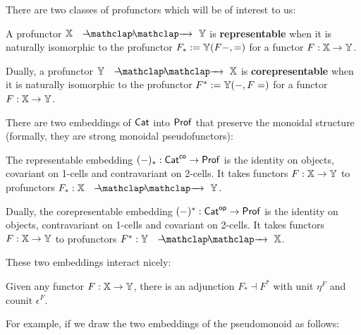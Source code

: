 There are two classes of profunctors which will be of interest to us:
\begin{definition}
A profunctor $\X\proarrow \Y$ is {\bf representable} when it is naturally isomorphic to the profunctor $F_*:=\mathbb{Y}(F-,=)$ for a functor $F: \mathbb{X}\to \mathbb{Y}$.


Dually, a profunctor $\Y\proarrow \X$ is {\bf corepresentable} when it is naturally isomorphic to the profunctor $F^*:=\mathbb{Y}(-,F=)$ for a functor $F: \mathbb{X}\to \mathbb{Y}$.
\end{definition}
There are two embeddings of ${\sf Cat}$ into ${\sf Prof}$ that preserve the monoidal structure (formally, they are strong monoidal pseudofunctors):
\begin{definition}
The representable embedding $(-)_*:{\sf Cat}^{\mathsf{co}} \to {\sf Prof}$ is the identity on objects,  covariant on 1-cells and contravariant on 2-cells.  It takes functors $F:\mathbb{X}\to \mathbb{Y}$ to profunctors  $F_*:\X\proarrow \Y$.

Dually, the corepresentable embedding $(-)^*:{\sf Cat}^{\mathsf{op}} \to {\sf Prof}$  is the identity on objects, contravariant on 1-cells and covariant on 2-cells. It takes functors $F:\mathbb{X}\to \mathbb{Y}$ to profunctors  $F^*:\Y\proarrow \X$.
\end{definition}
These two embeddings interact nicely:
\begin{lemma}
Given any functor $F:\mathbb{X}\to \mathbb{Y}$, there is an adjunction $F_* \dashv F^*$ with unit $\eta^F$ and counit $\epsilon^F$.
\end{lemma}
For example, if we draw the two embeddings of the pseudomonoid as follows:
